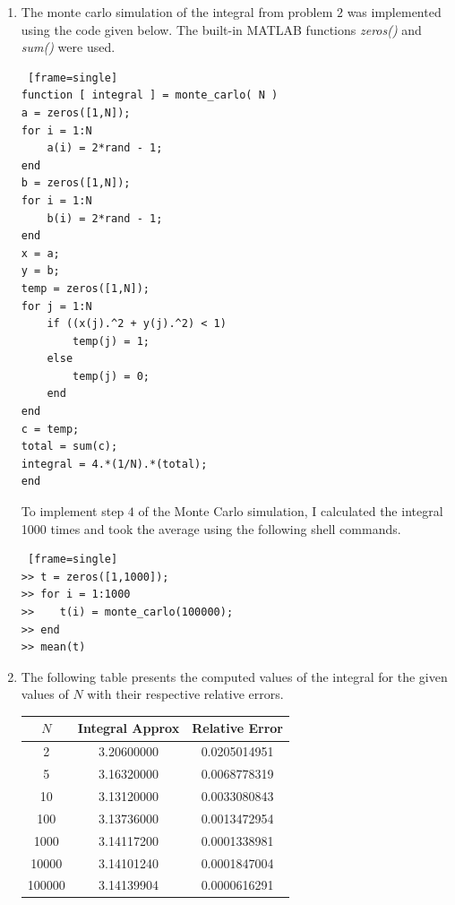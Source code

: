 \documentclass[paper=a4, fontsize=11pt]{scrartcl} %
\numberwithin{equation}{section} %
\numberwithin{figure}{section} %
\numberwithin{table}{section} %
\begin{document}
\begin{enumerate}

\item
The monte carlo simulation of the integral from problem $2$ was implemented using the code given below.  The built-in MATLAB functions \textit{zeros()} and \textit{sum()} were used.  

\begin{lstlisting} [frame=single]
function [ integral ] = monte_carlo( N )
a = zeros([1,N]);
for i = 1:N  
    a(i) = 2*rand - 1;
end
b = zeros([1,N]);
for i = 1:N  
    b(i) = 2*rand - 1;
end
x = a;
y = b;
temp = zeros([1,N]);
for j = 1:N
    if ((x(j).^2 + y(j).^2) < 1)
        temp(j) = 1;
    else
        temp(j) = 0;
    end
end
c = temp;
total = sum(c);
integral = 4.*(1/N).*(total);
end
\end{lstlisting}

To implement step $4$ of the Monte Carlo simulation, I calculated the integral 1000 times and took the average using the following shell commands.  

\begin{lstlisting} [frame=single]
>> t = zeros([1,1000]);
>> for i = 1:1000
>>    t(i) = monte_carlo(100000);
>> end
>> mean(t)
\end{lstlisting}

\clearpage

\item
The following table presents the computed values of the integral for the given values of $N$ with their respective relative errors.  

\begin{center}
  \begin{tabular}{ | c | c | c | }
    \hline
    $N$    & Integral Approx & Relative Error \\ \hline
    2      & 3.20600000      & 0.0205014951 \\ \hline
    5      & 3.16320000      & 0.0068778319 \\ \hline
    10     & 3.13120000      & 0.0033080843 \\ \hline
    100    & 3.13736000      & 0.0013472954 \\ \hline
    1000   & 3.14117200      & 0.0001338981 \\ \hline
    10000  & 3.14101240      & 0.0001847004 \\ \hline
    100000 & 3.14139904      & 0.0000616291 \\
    \hline
  \end{tabular}
\end{center}


\end{enumerate}
\end{document}
